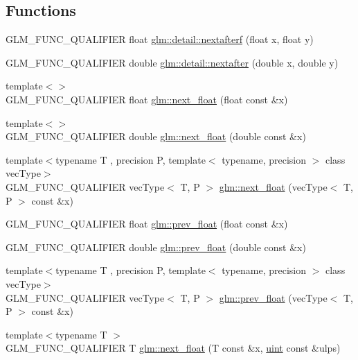 \subsection*{Functions}
\begin{DoxyCompactItemize}
\item 
G\+L\+M\+\_\+\+F\+U\+N\+C\+\_\+\+Q\+U\+A\+L\+I\+F\+I\+E\+R float \hyperlink{namespaceglm_1_1detail_ab0eb795c482130b1d6c83470bdb031e6}{glm\+::detail\+::nextafterf} (float x, float y)
\item 
G\+L\+M\+\_\+\+F\+U\+N\+C\+\_\+\+Q\+U\+A\+L\+I\+F\+I\+E\+R double \hyperlink{namespaceglm_1_1detail_a3c14f8400407e8b4cff5be12ceef2c1e}{glm\+::detail\+::nextafter} (double x, double y)
\item 
{\footnotesize template$<$$>$ }\\G\+L\+M\+\_\+\+F\+U\+N\+C\+\_\+\+Q\+U\+A\+L\+I\+F\+I\+E\+R float \hyperlink{namespaceglm_a094d145a4ae8efb9e42e88883cfb15f1}{glm\+::next\+\_\+float} (float const \&x)
\item 
{\footnotesize template$<$$>$ }\\G\+L\+M\+\_\+\+F\+U\+N\+C\+\_\+\+Q\+U\+A\+L\+I\+F\+I\+E\+R double \hyperlink{namespaceglm_a451149113e1a5083fcba0546de81ad51}{glm\+::next\+\_\+float} (double const \&x)
\item 
{\footnotesize template$<$typename T , precision P, template$<$ typename, precision $>$ class vec\+Type$>$ }\\G\+L\+M\+\_\+\+F\+U\+N\+C\+\_\+\+Q\+U\+A\+L\+I\+F\+I\+E\+R vec\+Type$<$ T, P $>$ \hyperlink{namespaceglm_a7e678a59e625a9453c8847e3d0e01625}{glm\+::next\+\_\+float} (vec\+Type$<$ T, P $>$ const \&x)
\item 
G\+L\+M\+\_\+\+F\+U\+N\+C\+\_\+\+Q\+U\+A\+L\+I\+F\+I\+E\+R float \hyperlink{namespaceglm_a1fd407652d7ccfbe810674a2e5cbc8eb}{glm\+::prev\+\_\+float} (float const \&x)
\item 
G\+L\+M\+\_\+\+F\+U\+N\+C\+\_\+\+Q\+U\+A\+L\+I\+F\+I\+E\+R double \hyperlink{namespaceglm_a82cdd5674b80569f118b33a6a327c9bd}{glm\+::prev\+\_\+float} (double const \&x)
\item 
{\footnotesize template$<$typename T , precision P, template$<$ typename, precision $>$ class vec\+Type$>$ }\\G\+L\+M\+\_\+\+F\+U\+N\+C\+\_\+\+Q\+U\+A\+L\+I\+F\+I\+E\+R vec\+Type$<$ T, P $>$ \hyperlink{namespaceglm_a90916626e6b0ed925938226f31b38c6b}{glm\+::prev\+\_\+float} (vec\+Type$<$ T, P $>$ const \&x)
\item 
{\footnotesize template$<$typename T $>$ }\\G\+L\+M\+\_\+\+F\+U\+N\+C\+\_\+\+Q\+U\+A\+L\+I\+F\+I\+E\+R T \hyperlink{namespaceglm_ae4ffae05b7502be722f522c04f7e42ac}{glm\+::next\+\_\+float} (T const \&x, \hyperlink{stb__image_8c_a91ad9478d81a7aaf2593e8d9c3d06a14}{uint} const \&ulps)

\end{DoxyCompactItemize}
